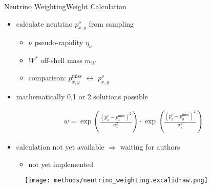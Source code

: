 \documentclass[9pt, aspectratio=169]{beamer}
\begin{document}
\begin{frame}{Neutrino Weighting}{Weight Calculation}
	\begin{minipage}{.60\textwidth}
		\begin{itemize}
			\item calculate neutrino $p_{x,y}^\nu$ from sampling
			\begin{itemize}
				\item $\nu$ pseudo-rapidity $\eta_\nu$
				\item $W^*$ off-shell mass $m_W$
				\item comparison: $p_{x,y}^\text{miss}$ $\leftrightarrow$ $p_{x,y}^\nu$
			\end{itemize}	
			\item mathematically 0,1 or 2 solutions possible
		\end{itemize}

		\begin{align*}
			w = \exp\left(\frac{(p_x^\nu-p_x^\text{miss})^2}{\sigma_x^2}\right) \cdot \exp\left(\frac{(p_y^\nu-p_y^\text{miss})^2}{\sigma_y^2}\right)
		\end{align*}

		\begin{itemize}
			\item calculation not yet available $\Rightarrow$ waiting for authors
			\begin{itemize}
				\item not yet implemented
			\end{itemize}
		\end{itemize}
	\end{minipage}\hfill
	\begin{minipage}{.38\textwidth}
		\begin{figure}
			\centering
			\texttt{[image: methods/neutrino\_weighting.excalidraw.png]}
		\end{figure}
	\end{minipage}
\end{frame}
\end{document}
